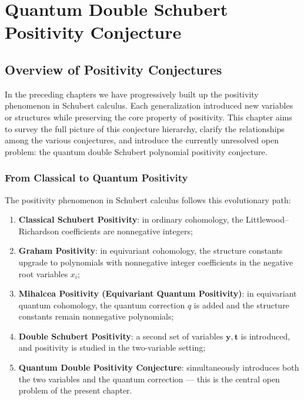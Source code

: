 
\chapter{Quantum Double Schubert Positivity Conjecture}
\label{chap:QuantumDoublePositivityConjecture}

\section{Overview of Positivity Conjectures}
\label{sec:PositivityConjectureHierarchy}

In the preceding chapters we have progressively built up the positivity phenomenon in Schubert calculus. Each generalization introduced new variables or structures while preserving the core property of positivity. This chapter aims to survey the full picture of this conjecture hierarchy, clarify the relationships among the various conjectures, and introduce the currently unresolved open problem: the quantum double Schubert polynomial positivity conjecture.

\subsection{From Classical to Quantum Positivity}
\label{sec:ClassicalToQuantumPositivity}

The positivity phenomenon in Schubert calculus follows this evolutionary path:

\begin{sloppypar}
\begin{enumerate}
\item[(i)] \textbf{Classical Schubert Positivity}: in ordinary cohomology, the Littlewood--Richardson coefficients are nonnegative integers;
\item[(ii)] \textbf{Graham Positivity}: in equivariant cohomology, the structure constants upgrade to polynomials with nonnegative integer coefficients in the negative root variables $x_i$;
\item[(iii)] \textbf{Mihalcea Positivity (Equivariant Quantum Positivity)}: in equivariant quantum cohomology, the quantum correction $q$ is added and the structure constants remain nonnegative polynomials;
\item[(iv)] \textbf{Double Schubert Positivity}: a second set of variables $\mathbf{y}, \mathbf{t}$ is introduced, and positivity is studied in the two-variable setting;
\item[(v)] \textbf{Quantum Double Positivity Conjecture}: simultaneously introduces both the two variables and the quantum correction --- this is the central open problem of the present chapter.
\end{enumerate}
\end{sloppypar}

